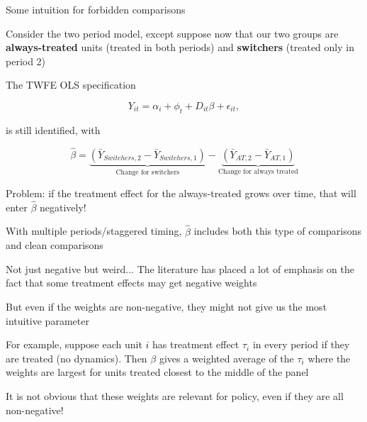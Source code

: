 \documentclass[aspectratio = 169, 13pt]{beamer}
\begin{document}
\begin{frame}{Some intuition for forbidden comparisons}
  \begin{wideitemize}
    \item
    Consider the two period model, except suppose now that our two groups are \textbf{always-treated} units (treated in both periods) and \textbf{switchers} (treated only in period 2)

    \item
    The TWFE OLS specification

    $$ Y_{it} = \alpha_i + \phi_t + D_{it} \beta  + \epsilon_{it},$$

    is still identified, with

    $$\hat\beta =  \underbrace{ \left(\bar{Y}_{Switchers, 2} - \bar{Y}_{Switchers, 1} \right) }_{\text{Change for switchers}} - \underbrace{ \left(\bar{Y}_{AT, 2} - \bar{Y}_{AT, 1} \right) }_{\text{Change for always treated}}  $$

    \item
    Problem: if the treatment effect for the always-treated grows over time, that will enter $\hat\beta$ negatively!

    \item
    With multiple periods/staggered timing, $\hat\beta$ includes both this type of comparisons and clean comparisons
  \end{wideitemize}
\end{frame}

\begin{frame}{Not just negative but weird...}
  The literature has placed a lot of emphasis on the fact that some treatment effects may get negative weights
  \begin{wideitemize}
    \item
    But even if the weights are non-negative, they might not give us the most intuitive parameter

    \item
    For example, suppose each unit $i$ has treatment effect $\tau_i$ in every period if they are treated (no dynamics). Then $\beta$ gives a weighted average of the $\tau_i$ where the weights are largest for units treated closest to the middle of the panel

    \item
    It is not obvious that these weights are relevant for policy, even if they are all non-negative!
  \end{wideitemize}
\end{frame}
\end{document}

